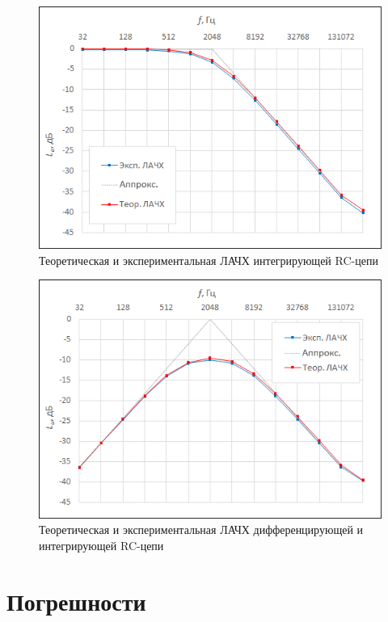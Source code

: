 \begin{figure}[H]
	\begin{center}
		\includegraphics[width=13cm]{2}
		\caption{Теоретическая и экспериментальная ЛАЧХ интегрирующей
RC-цепи} 
		\label{t:e2} %
	\end{center}
\end{figure}

\begin{figure}[H]
	\begin{center}
		\includegraphics[width=13cm]{3}
		\caption{Теоретическая и экспериментальная ЛАЧХ дифференцирующей и интегрирующей RC-цепи} 
		\label{t:e3} %
	\end{center}
\end{figure}

\section{Погрешности}

